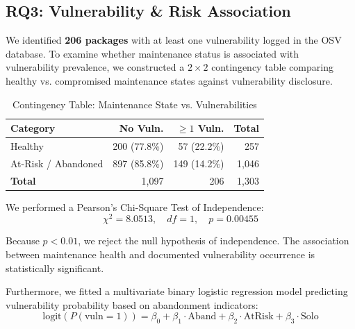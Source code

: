 \documentclass[conference]{IEEEtran}
\begin{document}
\vspace{2mm}
\noindent{}
\vspace{2mm}

\subsection{RQ3: Vulnerability \& Risk Association}

We identified \textbf{206 packages} with at least one vulnerability logged in the OSV database. To examine whether maintenance status is associated with vulnerability prevalence, we constructed a $2 \times 2$ contingency table comparing healthy vs. compromised maintenance states against vulnerability disclosure.

\begin{table}[htbp]
\caption{Contingency Table: Maintenance State vs. Vulnerabilities}
\label{tab:contingency}
\centering
\begin{tabular}{lrrr}
\toprule
\textbf{Category} & \textbf{No Vuln.} & \textbf{$\ge 1$ Vuln.} & \textbf{Total} \\
\midrule
Healthy & 200 (77.8\%) & 57 (22.2\%) & 257 \\
At-Risk / Abandoned & 897 (85.8\%) & 149 (14.2\%) & 1,046 \\
\midrule
\textbf{Total} & 1,097 & 206 & 1,303 \\
\bottomrule
\end{tabular}
\end{table}

We performed a Pearson's Chi-Square Test of Independence:
\begin{equation}
\chi^2 = 8.0513, \quad df = 1, \quad p = 0.00455
\end{equation}

Because $p < 0.01$, we reject the null hypothesis of independence. The association between maintenance health and documented vulnerability occurrence is statistically significant.

Furthermore, we fitted a multivariate binary logistic regression model predicting vulnerability probability based on abandonment indicators:
\begin{equation}
\text{logit}(P(\text{vuln}=1)) = \beta_0 + \beta_1 \cdot \text{Aband} + \beta_2 \cdot \text{AtRisk} + \beta_3 \cdot \text{Solo}
\end{equation}
\end{document}
